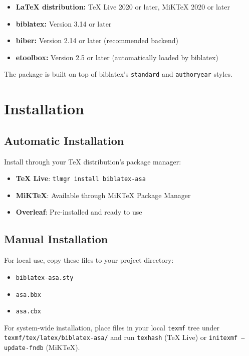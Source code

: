 \documentclass[11pt,a4paper]{ltxdoc}
\begin{document}
\begin{itemize}
  \item \textbf{LaTeX distribution:} TeX Live 2020 or later, MiKTeX 2020 or later
  \item \textbf{biblatex:} Version 3.14 or later
  \item \textbf{biber:} Version 2.14 or later (recommended backend)
  \item \textbf{etoolbox:} Version 2.5 or later (automatically loaded by biblatex)
\end{itemize}

The package is built on top of biblatex's \texttt{standard} and \texttt{authoryear} styles.

\section{Installation}

\subsection{Automatic Installation}

Install through your TeX distribution's package manager:

\begin{itemize}
  \item \textbf{TeX Live}: \texttt{tlmgr install biblatex-asa}
  \item \textbf{MiKTeX}: Available through MiKTeX Package Manager
  \item \textbf{Overleaf}: Pre-installed and ready to use
\end{itemize}

\subsection{Manual Installation}

For local use, copy these files to your project directory:
\begin{itemize}
  \item \texttt{biblatex-asa.sty}
  \item \texttt{asa.bbx}
  \item \texttt{asa.cbx}
\end{itemize}

For system-wide installation, place files in your local \texttt{texmf} tree under \texttt{texmf/tex/latex/biblatex-asa/} and run \texttt{texhash} (TeX Live) or \texttt{initexmf --update-fndb} (MiKTeX).
\end{document}
